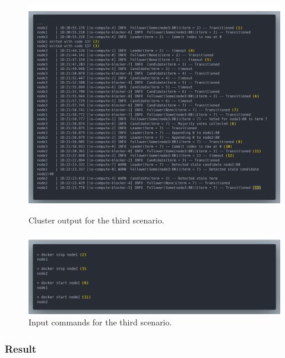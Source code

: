 \begin{figure}[!ht]
\centering
\includegraphics[width=500pt]{images/scenario_3_cluster.png}
\caption{Cluster output for the third scenario.}
\label{fig:scenario-3-cluster}
\includegraphics[width=500pt]{images/scenario_3_commands.png}
\caption{Input commands for the third scenario.}
\label{fig:scenario-3-commands}
\end{figure}

\subsubsection{Result}

